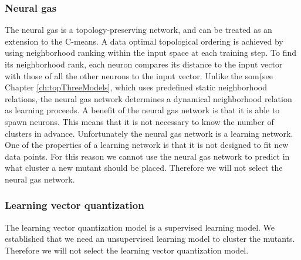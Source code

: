 \documentclass[../../main]{subfiles}
\begin{document}
\subsubsection{Neural gas}
The neural gas is a topology-preserving network, and can be treated as an extension to the C-means\cite{Du2010Clustering:Approach}.
A data optimal topological ordering is achieved by using neighborhood ranking within the input space at each training step\cite{Du2010Clustering:Approach}.
To find its neighborhood rank, each neuron compares its distance to the input vector with those of all the other neurons to the input vector\cite{Du2010Clustering:Approach}. 
Unlike the \acrlong{som}(see Chapter \ref{ch:topThreeModels}, which uses predefined static neighborhood relations, the neural gas network determines a dynamical neighborhood relation as learning proceeds\cite{Du2010Clustering:Approach}.
A benefit of the neural gas network is that it is able to spawn neurons.
This means that it is not necessary to know the number of clusters in advance.
Unfortunately the neural gas network is a learning network.
One of the properties of a learning network is that it is not designed to fit new data points\cite{supervisedUnsupervised}.
For this reason we cannot use the neural gas network to predict in what cluster a new mutant should be placed.
Therefore we will not select the neural gas network.

\subsubsection{Learning vector quantization}
The learning vector quantization model is a supervised learning model.
We established that we need an unsupervised learning model to cluster the mutants.
Therefore we will not select the learning vector quantization model.
\end{document}
